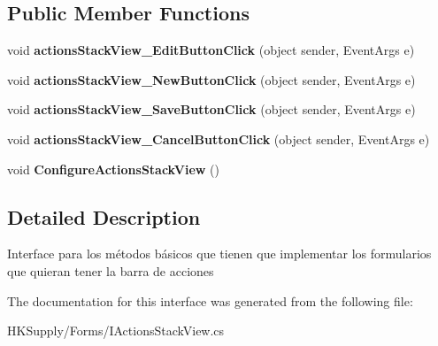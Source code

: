\subsection*{Public Member Functions}
\begin{DoxyCompactItemize}
\item 
\mbox{\label{interface_h_k_supply_1_1_forms_1_1_i_actions_stack_view_ae8deb0cdeaa1b41f48e9a497acce9334}} 
void {\bfseries actions\+Stack\+View\+\_\+\+Edit\+Button\+Click} (object sender, Event\+Args e)
\item 
\mbox{\label{interface_h_k_supply_1_1_forms_1_1_i_actions_stack_view_a9a3873c8695cb595fe413b51be87210d}} 
void {\bfseries actions\+Stack\+View\+\_\+\+New\+Button\+Click} (object sender, Event\+Args e)
\item 
\mbox{\label{interface_h_k_supply_1_1_forms_1_1_i_actions_stack_view_a31fb0c34c49bb46661a612f1916f7c2e}} 
void {\bfseries actions\+Stack\+View\+\_\+\+Save\+Button\+Click} (object sender, Event\+Args e)
\item 
\mbox{\label{interface_h_k_supply_1_1_forms_1_1_i_actions_stack_view_aa9fb7f15cdbc1fb6fdc19b522327a34a}} 
void {\bfseries actions\+Stack\+View\+\_\+\+Cancel\+Button\+Click} (object sender, Event\+Args e)
\item 
\mbox{\label{interface_h_k_supply_1_1_forms_1_1_i_actions_stack_view_a1a01439762b8cc84888acc2c7b7230d2}} 
void {\bfseries Configure\+Actions\+Stack\+View} ()
\end{DoxyCompactItemize}


\subsection{Detailed Description}
Interface para los métodos básicos que tienen que implementar los formularios que quieran tener la barra de acciones 



The documentation for this interface was generated from the following file\+:\begin{DoxyCompactItemize}
\item 
H\+K\+Supply/\+Forms/I\+Actions\+Stack\+View.\+cs\end{DoxyCompactItemize}
